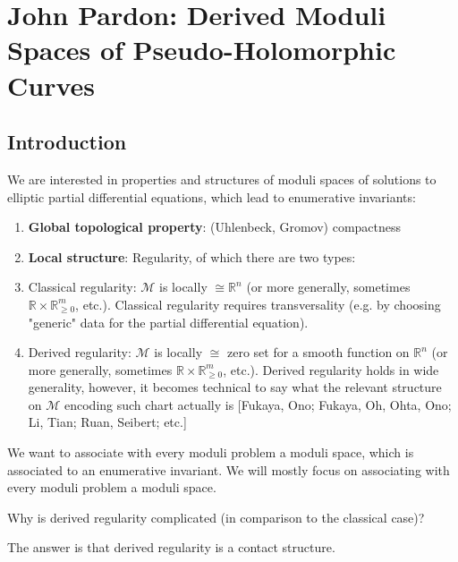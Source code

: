 \chapter{John Pardon: Derived Moduli Spaces of Pseudo-Holomorphic Curves}
\label{pardon}


\section{Introduction}

We are interested in properties and structures of moduli spaces of solutions to elliptic partial differential equations, which lead to enumerative invariants:

\begin{enumerate}
\item \textbf{Global topological property}: (Uhlenbeck, Gromov) compactness
\item \textbf{Local structure}: Regularity, of which there are two types:
    \item Classical regularity: $\mathcal{M}$ is locally $\cong \mathbb{R}^n$ (or more generally, sometimes $\mathbb{R}\times \mathbb{R}_{\ge 0}^m$, etc.). Classical regularity requires transversality (e.g. by choosing "generic" data for the partial differential equation).
    \item Derived regularity: $\mathcal{M}$ is locally $\cong$ zero set for a smooth function on $\mathbb{R}^n$ (or more generally, sometimes $\mathbb{R}\times \mathbb{R}_{\ge 0}^m$, etc.). Derived regularity holds in wide generality, however, it becomes technical to say what the relevant structure on $\mathcal{M}$ encoding such chart actually is [Fukaya, Ono; Fukaya, Oh, Ohta, Ono; Li, Tian; Ruan, Seibert; etc.]
\end{enumerate}

We want to associate with every moduli problem a moduli space, which is associated to an enumerative invariant. We will mostly focus on associating with every moduli problem a moduli space.

\begin{problem}

Why is derived regularity complicated (in comparison to the classical case)?

\end{problem}

The answer is that derived regularity is a contact structure.

